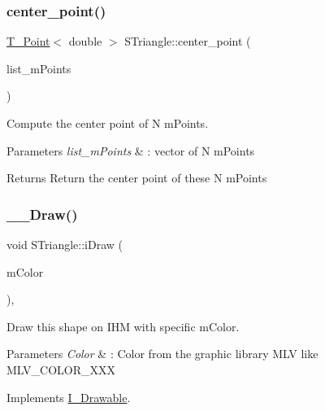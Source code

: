 \subsubsection{\texorpdfstring{center\+\_\+point()}{center\_point()}}
{\footnotesize\ttfamily \hyperlink{classPoint}{T_Point}$<$ double $>$ S\+Triangle\+::center\+\_\+point (\begin{DoxyParamCaption}\item[{const std\+::vector$<$ \hyperlink{classPoint}{T_Point}$<$ double $>$$>$ \&}]{list\+\_\+mPoints }\end{DoxyParamCaption})\hspace{0.3cm}{\ttfamily [static]}}



Compute the center point of N mPoints.


\begin{DoxyParams}{Parameters}
{\em list\+\_\+mPoints} & \+: vector of N mPoints \\
\hline
\end{DoxyParams}
\begin{DoxyReturn}{Returns}
Return the center point of these N mPoints
\end{DoxyReturn}
\mbox{\label{classSTriangle_a52f6b3c69067f90821cae1d378d1e575}} 
\subsubsection{\texorpdfstring{__Draw()}{iDraw()}}
{\footnotesize\ttfamily void S\+Triangle\+::iDraw (\begin{DoxyParamCaption}\item[{M\+L\+V\+\_\+\+Color}]{mColor }\end{DoxyParamCaption})\hspace{0.3cm}{\ttfamily [override]}, {\ttfamily [virtual]}}



Draw this shape on I\+HM with specific mColor.


\begin{DoxyParams}{Parameters}
{\em Color} & \+: Color from the graphic library M\+LV like M\+L\+V\+\_\+\+C\+O\+L\+O\+R\+\_\+\+X\+XX \\
\hline
\end{DoxyParams}


Implements \hyperlink{classDrawable}{I_Drawable}.

